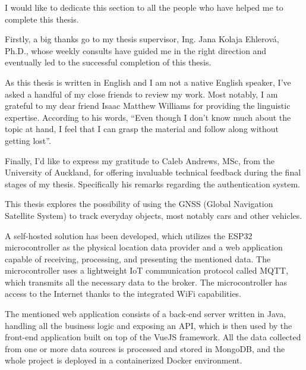 \documentclass[FM,BP,EN,fonts]{tulthesis}
\begin{document}

\begin{acknowledgement}
I would like to dedicate this section to all the people who have helped me to complete this thesis.

Firstly, a big thanks go to my thesis supervisor, Ing. Jana Kolaja Ehlerová, Ph.D., whose weekly consults have guided me in the right direction and eventually led to the successful completion of this thesis.

As this thesis is written in English and I am not a native English speaker, I've asked a handful of my close friends to review my work. Most notably, I am grateful to my dear friend Isaac Matthew Williams for providing the linguistic expertise. According to his words, \enquote{Even though I don’t know much about the topic at hand, I feel that I can grasp the material and follow along without getting lost}.

Finally, I'd like to express my gratitude to Caleb Andrews, MSc, from the University of Auckland, for offering invaluable technical feedback during the final stages of my thesis. Specifically his remarks regarding the authentication system.
\end{acknowledgement}

\begin{abstractEN}
This thesis explores the possibility of using the GNSS (Global Navigation Satellite System) to track everyday objects, most notably cars and other vehicles. 

A self-hosted solution has been developed, which utilizes the ESP32 microcontroller as the physical location data provider and a web application capable of receiving, processing, and presenting the mentioned data. The microcontroller uses a lightweight IoT communication protocol called MQTT, which transmits all the necessary data to the broker. The microcontroller has access to the Internet thanks to the integrated WiFi capabilities. 

The mentioned web application consists of a back-end server written in Java, handling all the business logic and exposing an API, which is then used by the front-end application built on top of the VueJS framework. All the data collected from one or more data sources is processed and stored in MongoDB, and the whole project is deployed in a containerized Docker environment.
\end{abstractEN}

\vspace{.5cm}
\end{document}
